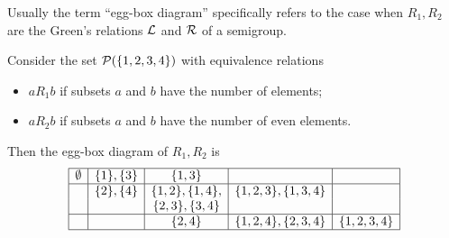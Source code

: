 Usually the term ``egg-box diagram'' specifically refers to the case when $R_1, R_2$ are the Green's relations $\mathcal{L}$ and $\mathcal{R}$ of a semigroup.

\begin{example}
Consider the set $\operatorname{\mathcal{P}}(\{1,2,3,4\})$ with equivalence relations
\begin{itemize}
\item $aR_1 b$ if subsets $a$ and $b$ have the number of elements;
\item $aR_2 b$ if subsets $a$ and $b$ have the number of even elements.
\end{itemize}
Then the egg-box diagram of $R_1,R_2$ is
\[ \begin{array}{|c|c|c|c|c|}
\hline
\emptyset & \{1\}, \{3\} & \{1,3\} && \\ \hline
& \{2\}, \{4\} & \{1,2\}, \{1,4\}, & \{1,2,3\}, \{1,3,4\} & \\
&  & \{2,3\}, \{3,4\} &  & \\ \hline
&& \{2,4\} & \{1,2,4\}, \{2,3,4\}  & \{1,2,3,4\}    \\ \hline
\end{array} \]
\end{example}

